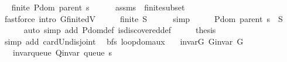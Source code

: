 \begin{isabellebody}
\ \isamarkupfalse%
\ {\isachardoublequoteopen}finite\ {\isacharparenleft}{\kern0pt}P{\isachardot}{\kern0pt}dom\ {\isacharparenleft}{\kern0pt}parent\ s{\isacharparenright}{\kern0pt}{\isacharparenright}{\kern0pt}{\isachardoublequoteclose}\isanewline
\ \ \ \ \isamarkupfalse%
\ assms{\isacharparenleft}{\kern0pt}{}{\isacharcomma}{\kern0pt}\ {}{\isacharparenright}{\kern0pt}\ finite{\isacharunderscore}{\kern0pt}subset\isanewline
\ \ \ \ \isamarkupfalse%
\ {\isacharparenleft}{\kern0pt}fastforce\ intro{\isacharcolon}{\kern0pt}\ G{\isachardot}{\kern0pt}finite{\isacharunderscore}{\kern0pt}dV{\isacharparenright}{\kern0pt}\isanewline
\ \ \isamarkupfalse%
\ \isamarkupfalse%
\ {\isachardoublequoteopen}finite\ {\isacharquery}{\kern0pt}S{\isachardoublequoteclose}\isanewline
\ \ \ \ \isamarkupfalse%
\ simp\isanewline
\ \ \isamarkupfalse%
\ \isamarkupfalse%
\ {\isachardoublequoteopen}P{\isachardot}{\kern0pt}dom\ {\isacharparenleft}{\kern0pt}parent\ s{\isacharparenright}{\kern0pt}\ {\isasyminter}\ {\isacharquery}{\kern0pt}S\ {\isacharequal}{\kern0pt}\ {\isacharbraceleft}{\kern0pt}{\isacharbraceright}{\kern0pt}{\isachardoublequoteclose}\isanewline
\ \ \ \ \isamarkupfalse%
\ {\isacharparenleft}{\kern0pt}auto\ simp\ add{\isacharcolon}{\kern0pt}\ P{\isachardot}{\kern0pt}dom{\isacharunderscore}{\kern0pt}def\ is{\isacharunderscore}{\kern0pt}discovered{\isacharunderscore}{\kern0pt}def{\isacharparenright}{\kern0pt}\isanewline
\ \ \isamarkupfalse%
\ \isamarkupfalse%
\ {\isacharquery}{\kern0pt}thesis\isanewline
\ \ \ \ \isamarkupfalse%
\ {\isacharparenleft}{\kern0pt}simp\ add{\isacharcolon}{\kern0pt}\ card{\isacharunderscore}{\kern0pt}Un{\isacharunderscore}{\kern0pt}disjoint{\isacharparenright}{\kern0pt}\isanewline
{}\isamarkupfalse%
%
\endisatagproof
{\isafoldproof}%
%
\isadelimproof
\isanewline
%
\endisadelimproof
\isanewline
{}\isamarkupfalse%
\ {\isacharparenleft}{\kern0pt}\ bfs{\isacharparenright}{\kern0pt}\ loop{\isacharunderscore}{\kern0pt}dom{\isacharunderscore}{\kern0pt}aux{\isacharunderscore}{\kern0pt}{}{\isacharcolon}{\kern0pt}\isanewline
\ \ \ invar{\isacharunderscore}{\kern0pt}G{\isacharcolon}{\kern0pt}\ {\isachardoublequoteopen}G{\isachardot}{\kern0pt}invar\ G{\isachardoublequoteclose}\isanewline
\ \ \ invar{\isacharunderscore}{\kern0pt}queue{\isacharcolon}{\kern0pt}\ {\isachardoublequoteopen}Q{\isacharunderscore}{\kern0pt}invar\ {\isacharparenleft}{\kern0pt}queue\ s{\isacharparenright}{\kern0pt}{\isachardoublequoteclose}\isanewline

\end{isabellebody}
